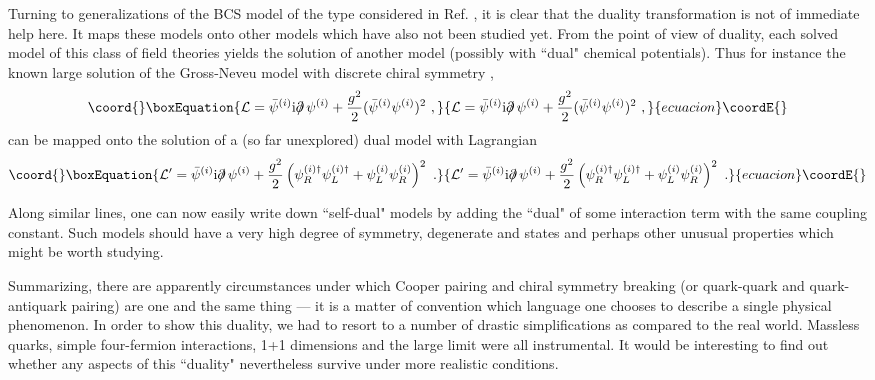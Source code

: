 \documentclass[a4paper,twocolumn,aps]{revtex4}
\begin{document}
Turning to generalizations of the BCS\coordHE{} model of the type considered in Ref. \cite{R4}, 
it is clear that the duality transformation is not of immediate help here. It maps these models onto 
other models which have also not been studied yet. From the point of view of duality, each solved model
of this class of field theories
yields the solution of another model (possibly with ``dual" chemical potentials). Thus for instance the
known large \coordHE{} solution of the Gross-Neveu model with discrete chiral symmetry \cite{R2,R10},
\begin{equation}\coord{}\boxEquation{
{\cal L}= \bar{\psi}^{(i)} {\rm i} \partial \!\!\!/ \, \psi^{(i)} +
\frac{g^2}{2} (\bar{\psi}^{(i)}\psi^{(i)})^2 \ ,
\label{eq11p}
}{
{\cal L}= \bar{\psi}^{(i)} {\rm i} \partial \!\!\!/ \, \psi^{(i)} +
\frac{g^2}{2} (\bar{\psi}^{(i)}\psi^{(i)})^2 \ ,
}{ecuacion}\coordE{}\end{equation} 
can be mapped onto the solution of a (so far unexplored) dual model with Lagrangian
\begin{equation}\coord{}\boxEquation{
{\cal L}'= \bar{\psi}^{(i)} {\rm i} \partial \!\!\!/ \, \psi^{(i)} +
\frac{g^2}{2} \left(\psi_R^{(i)\dagger}\psi_L^{(i)\dagger} +  \psi_L^{(i)}\psi_R^{(i)}\right)^2 \ .
\label{eq12p}
}{
{\cal L}'= \bar{\psi}^{(i)} {\rm i} \partial \!\!\!/ \, \psi^{(i)} +
\frac{g^2}{2} \left(\psi_R^{(i)\dagger}\psi_L^{(i)\dagger} +  \psi_L^{(i)}\psi_R^{(i)}\right)^2 \ .
}{ecuacion}\coordE{}\end{equation}

Along similar lines, one can now easily write down ``self-dual" models by adding the ``dual" of
some interaction term with the same coupling constant. Such models should have
a very high degree of symmetry, degenerate \coordHE{} and \coordHE{} states and 
perhaps other unusual properties which might be worth studying.

Summarizing, there are apparently circumstances under which Cooper pairing and
chiral symmetry breaking (or quark-quark and  quark-antiquark pairing)
are one and the same thing ---  it is a matter of convention which language one chooses
to describe a single physical phenomenon.  
In order to show this duality, we had to resort to a number of drastic simplifications 
as compared to the real world. Massless quarks, simple four-fermion interactions, 
1+1 dimensions and the large \coordHE{} limit
were all instrumental. It would be interesting to find out whether any aspects
of this ``duality" nevertheless survive under more realistic conditions. 
\newpage
\end{document}

